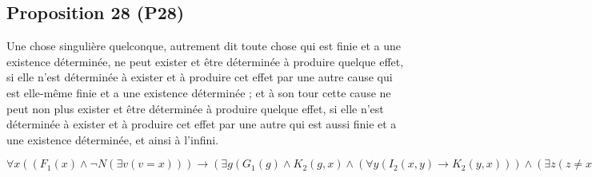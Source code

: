 \documentclass[10pt,a3paper]{article}
\begin{document}
\clearpage

\subsection{Proposition 28 (P28)}

\begin{center}
Une chose singulière quelconque, autrement dit toute chose qui est finie et a une existence déterminée, ne peut exister et être déterminée à produire quelque effet, si elle n’est déterminée à exister et à produire cet effet par une autre cause qui est elle-même finie et a une existence déterminée ; et à son tour cette cause ne peut non plus exister et être déterminée à produire quelque effet, si elle n’est déterminée à exister et à produire cet effet par une autre qui est aussi finie et a une existence déterminée, et ainsi à l’infini.
\end{center}

\begin{center}
$\forall x ((F_1(x) \land \neg N(\exists v (v = x))) \rightarrow (\exists g (G_1(g) \land K_2(g,x) \land (\forall y (I_2(x,y) \rightarrow K_2(y,x))) \land (\exists z (z \neq x \land K_2(z,x) \land \neg N(\exists v (v = z)) \land F_1(z))))))$
\end{center}
\end{document}
